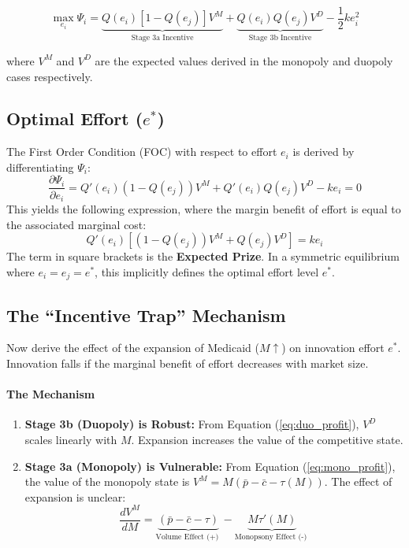 \documentclass[12pt]{article}
\begin{document}
\begin{equation}
    \max_{e_i} \Psi_i = \underbrace{Q(e_i)[1-Q(e_j)] V^M}_{\text{Stage 3a Incentive}} + \underbrace{Q(e_i)Q(e_j) V^D}_{\text{Stage 3b Incentive}} - \frac{1}{2} k e_i^2
\end{equation}

where $V^M$ and $V^D$ are the expected values derived in the monopoly and duopoly cases respectively.

\subsection{Optimal Effort ($e^*$)}
The First Order Condition (FOC) with respect to effort $e_i$ is derived by differentiating $\Psi_i$:
\begin{equation}
    \frac{\partial \Psi_i}{\partial e_i} = Q'(e_i)(1-Q(e_j)) V^M + Q'(e_i)Q(e_j) V^D - k e_i = 0
\end{equation}
This yields the following expression, where the margin benefit of effort is equal to the associated marginal cost:
\begin{equation} \label{eq:FOC_final}
    Q'(e_i) \left[ (1-Q(e_j)) V^M + Q(e_j) V^D \right] = k e_i
\end{equation}
The term in square brackets is the \textbf{Expected Prize}. In a symmetric equilibrium where $e_i = e_j = e^*$, this implicitly defines the optimal effort level $e^*$.

\subsection{The ``Incentive Trap'' Mechanism}
Now derive the effect of the expansion of Medicaid ($M \uparrow$) on innovation effort $e^*$. Innovation falls if the marginal benefit of effort decreases with market size.

\paragraph{The Mechanism}
\begin{enumerate}
    \item \textbf{Stage 3b (Duopoly) is Robust:} From Equation (\ref{eq:duo_profit}), $V^D$ scales linearly with $M$. Expansion increases the value of the competitive state.
    \item \textbf{Stage 3a (Monopoly) is Vulnerable:} From Equation (\ref{eq:mono_profit}), the value of the monopoly state is $V^M = M(\bar{p} - \bar{c} - \tau(M))$. The effect of expansion is unclear:
    \begin{equation}
        \frac{d V^M}{d M} = \underbrace{(\bar{p} - \bar{c} - \tau)}_{\text{Volume Effect (+) }} - \underbrace{M \tau'(M)}_{\text{Monopsony Effect (-) }}
    \end{equation}
\end{enumerate}
\end{document}
